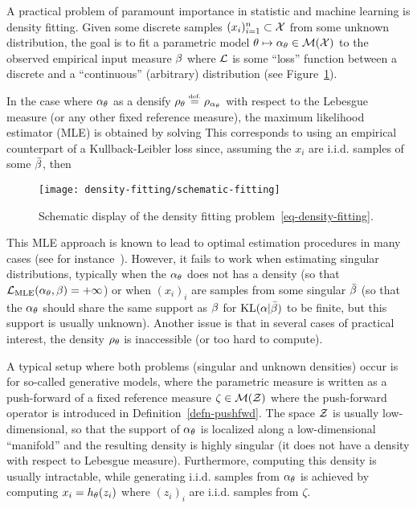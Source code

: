 A practical problem of paramount importance in statistic and machine learning is density fitting. 
%
Given some discrete samples $(x_i)_{i=1}^n \subset \mathcal{X}$ from some unknown distribution, the goal is to fit a parametric model $\theta \mapsto \alpha_\theta \in \mathcal{M}(\mathcal{X})$ to the observed empirical input measure $\beta$
where $\mathcal{L}$ is some ``loss'' function between a discrete and a ``continuous'' (arbitrary) distribution (see Figure~\ref{fig-density-fitting}). 

In the case where $\alpha_\theta$ as a densify $\rho_{\theta} \stackrel{\mbox{\upshape\tiny def.}}{=} \rho_{\alpha_\theta}$ with respect to the Lebesgue measure (or any other fixed reference measure), the maximum likelihood estimator (MLE) is obtained by solving
This corresponds to using an empirical counterpart of a Kullback-Leibler loss since, assuming the $x_i$ are i.i.d. samples of some $\bar{\beta}$, then 

\begin{figure}
\centering
\texttt{[image: density-fitting/schematic-fitting]}
\caption{\label{fig-density-fitting}
Schematic display of the density fitting problem~\ref{eq-density-fitting}.
}
\end{figure}


\newcommand{\fPF}{h}

This MLE approach is known to lead to optimal estimation procedures in many cases (see for instance~\cite{owen2001empirical}). However, it fails to work when estimating singular distributions, typically when the $\alpha_\theta$ does not has a density (so that $\mathcal{L}_{\text{MLE}}(\alpha_\theta,\beta) = +\infty$) or when $(x_i)_i$ are samples from some singular $\bar{\beta}$ (so that the $\alpha_\theta$ should share the same support as $\beta$ for $\operatorname{KL}(\alpha|\bar{\beta})$ to be finite, but this support is usually unknown). Another issue is that in several cases of practical interest, the density $\rho_{\theta}$ is inaccessible (or too hard to compute).

A typical setup where both problems (singular and unknown densities) occur is for so-called generative models, where the parametric measure is written as a push-forward of a fixed reference measure $\zeta \in \mathcal{M}(\mathcal{Z})$
\eq{
	\al_\th = \fPF_{\th,\sharp} \zeta \qwhereq \fPF_\th : \Zz \rightarrow \Xx
}
where the push-forward operator is introduced in Definition~\ref{defn-pushfwd}. The space $\mathcal{Z}$ is usually low-dimensional, so that the support of $\alpha_\theta$ is localized along a low-dimensional ``manifold'' and the resulting density is highly singular (it does not have a density with respect to Lebesgue measure).
%
Furthermore, computing this density is usually intractable, while generating i.i.d. samples from $\alpha_\theta$ is achieved by computing $x_i=\fPF_\th(z_i)$ where $(z_i)_i$ are i.i.d. samples from $\zeta$.

